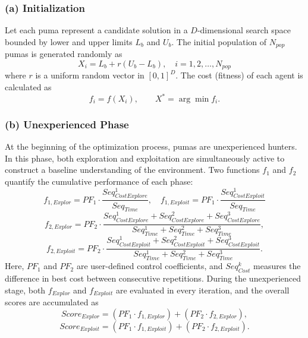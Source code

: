 \documentclass[a4paper,12pt]{article}
\begin{document}
\subsubsection*{(a) Initialization}
Let each puma represent a candidate solution in a $D$-dimensional search space bounded by lower and upper limits $L_b$ and $U_b$. The initial population of $N_{pop}$ pumas is generated randomly as
\begin{equation}
X_i = L_b + r (U_b - L_b), \quad i = 1,2,\ldots,N_{pop}
\end{equation}
where $r$ is a uniform random vector in $[0,1]^D$. The cost (fitness) of each agent is calculated as
\begin{equation}
f_i = f(X_i), \qquad X^* = \arg\min f_i.
\end{equation}

\subsubsection*{(b) Unexperienced Phase}
At the beginning of the optimization process, pumas are unexperienced hunters. In this phase, both exploration and exploitation are simultaneously active to construct a baseline understanding of the environment. Two functions $f_1$ and $f_2$ quantify the cumulative performance of each phase:
\begin{equation}
f_{1,Explor} = PF_1 \cdot \frac{Seq^1_{CostExplore}}{Seq_{Time}}, \quad
f_{1,Exploit} = PF_1 \cdot \frac{Seq^1_{CostExploit}}{Seq_{Time}}
\end{equation}
\begin{equation}
f_{2,Explor} = PF_2 \cdot \frac{Seq^1_{CostExplore}+Seq^2_{CostExplore}+Seq^3_{CostExplore}}
{Seq^1_{Time}+Seq^2_{Time}+Seq^3_{Time}},
\end{equation}
\begin{equation}
f_{2,Exploit} = PF_2 \cdot \frac{Seq^1_{CostExploit}+Seq^2_{CostExploit}+Seq^3_{CostExploit}}
{Seq^1_{Time}+Seq^2_{Time}+Seq^3_{Time}}.
\end{equation}
Here, $PF_1$ and $PF_2$ are user-defined control coefficients, and $Seq^k_{Cost}$ measures the difference in best cost between consecutive repetitions. During the unexperienced stage, both $f_{Explor}$ and $f_{Exploit}$ are evaluated in every iteration, and the overall scores are accumulated as
\begin{equation}
Score_{Explor} = (PF_1 \cdot f_{1,Explor}) + (PF_2 \cdot f_{2,Explor}), 
\end{equation}
\begin{equation}
Score_{Exploit} = (PF_1 \cdot f_{1,Exploit}) + (PF_2 \cdot f_{2,Exploit}).
\end{equation}
\end{document}
